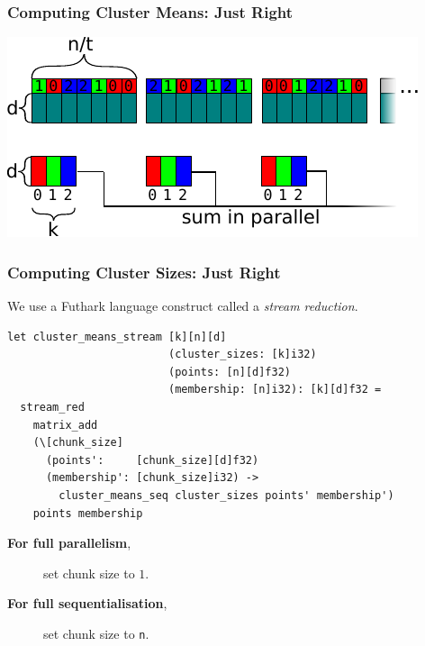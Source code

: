 \documentclass[rgb,dvipsnames]{beamer}
\begin{document}
\begin{frame}[fragile]
  \frametitle{Computing Cluster Means: Just Right}

  \begin{center}
\includegraphics[width=\textwidth]{img/cluster_means_chunked_reduce.pdf}
\end{center}
\end{frame}

\begin{frame}[fragile]
  \frametitle{Computing Cluster Sizes: Just Right}

  We use a Futhark language construct called a \textit{stream
    reduction}.

  \begin{lstlisting}
let cluster_means_stream [k][n][d]
                         (cluster_sizes: [k]i32)
                         (points: [n][d]f32)
                         (membership: [n]i32): [k][d]f32 =
  stream_red
    matrix_add
    (\[chunk_size]
      (points':     [chunk_size][d]f32)
      (membership': [chunk_size]i32) ->
        cluster_means_seq cluster_sizes points' membership')
    points membership
\end{lstlisting}

  \begin{description}
  \item[\textbf{For full parallelism},] set chunk size to $1$.
  \item[\textbf{For full sequentialisation},] set chunk size to \texttt{n}.
  \end{description}

\end{frame}
\end{document}
